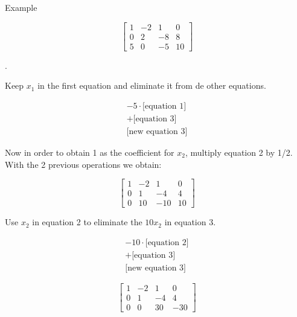 \documentclass{article}
\begin{document}
Example

\begin{equation}
    \begin{bmatrix}
        1 & -2 & 1 & 0\\
        0 & 2 & -8 & 8\\
        5 & 0 & -5 & 10
    \end{bmatrix}
\end{equation}

. \newline

Keep $x_1$ in the first equation and eliminate it from de other equations.

\begin{equation*}
    \begin{split}
        -5\cdot\text{[equation 1]}\\
        +\text{[equation 3]}\\
        \hline
        \text{[new equation 3]}
    \end{split}
\end{equation*}

Now in order to obtain 1 as the coefficient for $x_2$, multiply equation 2 by 1/2. With the 2 previous operations we obtain:

\begin{equation}
    \begin{bmatrix}
        1 & -2 & 1 & 0\\
        0 & 1 & -4 & 4\\
        0 & 10 & -10 & 10
    \end{bmatrix}
\end{equation}

Use $x_2$ in equation 2 to eliminate the $10x_2$ in equation 3.

\begin{equation*}
    \begin{split}
        -10\cdot\text{[equation 2]}\\
        +\text{[equation 3]}\\
        \hline
        \text{[new equation 3]}
    \end{split}
\end{equation*}

\begin{equation}
    \begin{bmatrix}
        1 & -2 & 1 & 0\\
        0 & 1 & -4 & 4\\
        0 & 0 & 30 & -30
    \end{bmatrix}
\end{equation}
\end{document}
